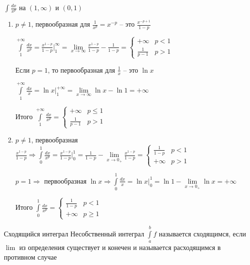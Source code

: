 \documentclass[12pt]{article}
\begin{document}
\begin{Example}{}
    $\int\limits \frac{dx}{x^p}$ на $(1, \infty)$ и $(0, 1)$
    \begin{enumerate}
        \item $p \neq 1$, первообразная для $\frac{1}{x^p} = x^{-p}$ -- это $\frac{x^{-p + 1}}{1 - p}$

        $\int\limits_1^{+ \infty} \frac{dx}{x^p} = \frac{x^{1 - p}}{1 - p}|_1^\infty = \lim\limits_{x \to \infty} \frac{x^{1 - p}}{1 - p} - \frac{1}{1 - p} = \begin{cases}
            + \infty & p < 1 \\
            \frac{1}{p - 1} & p > 1
        \end{cases}$

        Если $p = 1$, то первообразная для $\frac{1}{x}$ -- это $\ln{x}$

        $\int\limits_1^{+ \infty} \frac{dx}{x} = \ln{x}|_1^{+ \infty} = \lim\limits_{x \to \infty}\ln{x} - \ln{1} = + \infty$

        Итого $\int\limits_1^{+ \infty} \frac{dx}{x^p} = \begin{cases}
            + \infty & p \leq 1 \\
            \frac{1}{p - 1} & p > 1
        \end{cases}$

        \item $p \neq 1$, первообразная $\frac{x^{1 - p}}{1 - p} \Rightarrow \int\limits_0^1 \frac{dx}{x^p} = \frac{x^{1 - p}}{1 - p}|_0^1 = \frac{1}{1 - p} - \lim\limits_{x \to 0_+} \frac{x^{1 - p}}{1 - p} = \begin{cases}
            \frac{1}{1 - p} & p < 1 \\
            + \infty & p > 1
        \end{cases}$

        $p = 1 \Rightarrow$ первообразная $\ln{x} \Rightarrow \int\limits_0^1 \frac{dx}{x} = \ln{x}|_0^1 = \ln{1} - \lim\limits_{x \to 0_+} \ln{x} = + \infty$

        Итого $\int\limits_0^1 \frac{dx}{x^p} = \begin{cases}
            \frac{1}{1 - p} & p < 1 \\
            + \infty & p \geq 1
        \end{cases}$
    \end{enumerate}
\end{Example}

\begin{defin}{Сходящийся интеграл}
    Несобственный интеграл $\int\limits_a^b f$ называется сходящимся, если $\lim$ из определения существует и конечен и называется расходящимся в противном случае
\end{defin}
\end{document}
